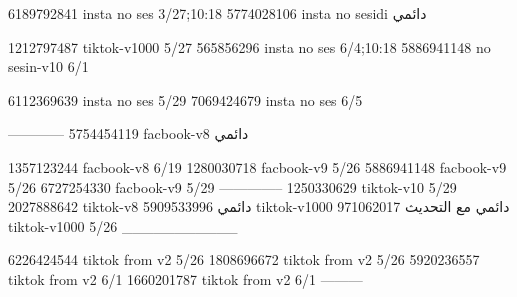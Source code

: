 
6189792841 insta no ses
3/27;10:18
5774028106 insta no sesidi
دائمي

1212797487 tiktok-v1000
5/27
565856296 insta no ses
6/4;10:18
5886941148 no sesin-v10
6/1

6112369639 insta no ses
5/29
7069424679 insta no ses
6/5

------------
5754454119 facbook-v8
دائمي

1357123244 facbook-v8
6/19
1280030718 facbook-v9
5/26
5886941148 facbook-v9
5/26
6727254330 facbook-v9
5/29
--------------
1250330629 tiktok-v10
5/29
2027888642 tiktok-v8
دائمي
5909533996 tiktok-v1000
دائمي مع التحديث
971062017 tiktok-v1000
5/26
___________

6226424544 tiktok from v2
5/26
1808696672 tiktok from v2
5/26
5920236557 tiktok from v2
6/1
1660201787 tiktok from v2
6/1
---------
